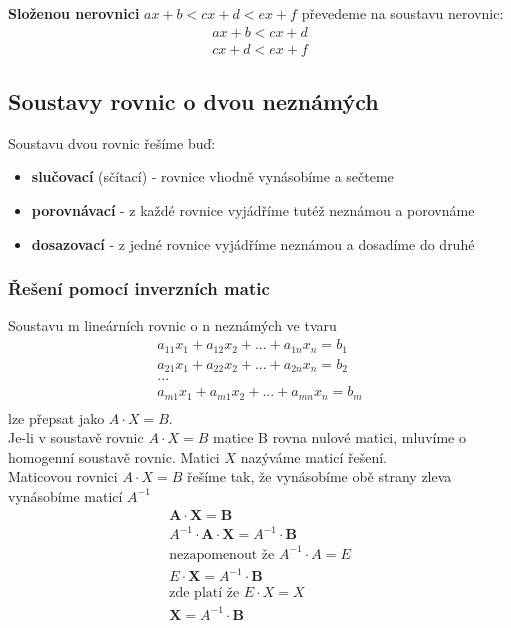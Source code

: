 \documentclass[12pt, a4paper]{article}
\begin{document}
\textbf{Složenou nerovnici} $ax + b < cx + d < ex + f$ převedeme na soustavu nerovnic:
\[ 
\begin{aligned}
ax + b < cx + d\\
cx + d < ex + f
\end{aligned}
\]

\subsection*{Soustavy rovnic o dvou neznámých}

Soustavu dvou rovnic řešíme buď:\\
\begin{itemize}
\item \textbf{slučovací} (sčítací) - rovnice vhodně vynásobíme a sečteme
\item \textbf{porovnávací} - z každé rovnice vyjádříme tutéž neznámou a porovnáme
\item \textbf{dosazovací} - z jedné rovnice vyjádříme neznámou a dosadíme do druhé 
\end{itemize}

\subsubsection*{Řešení pomocí inverzních matic}
Soustavu m lineárních rovnic o n neznámých ve tvaru\\
\[
\begin{aligned}
a_{11}x_1 + a_{12}x_2 + ... + a_{1n}x_n = b_1\\
a_{21}x_1 + a_{22}x_2 + ... + a_{2n}x_n = b_2\\
...\\
a_{m1}x_1 + a_{m1}x_2 + ... + a_{mn}x_n = b_m\\
\end{aligned}
\]
lze přepsat jako $A \cdot X = B$.\\
Je-li v soustavě rovnic $A \cdot X = B$ matice B rovna nulové matici, mluvíme o homogenní soustavě rovnic. Matici $X$ nazýváme maticí řešení.\\
Maticovou rovnici $A \cdot X = B$ řešíme tak, že vynásobíme obě strany zleva vynásobíme maticí $A^{-1}$\\
\[ \begin{aligned}
\textbf{A} \cdot \textbf{X} = \textbf{B}\\
\textbf{$A^{-1}$} \cdot \textbf{A} \cdot \textbf{X} = \textbf{$A^{-1}$} \cdot \textbf{B}\\
\text{nezapomenout že } A^{-1} \cdot A = E\\
E \cdot \textbf{X} = \textbf{$A^{-1}$} \cdot \textbf{B}\\
\text{zde platí že } E \cdot X = X\\
\textbf{X} = \textbf{$A^{-1}$} \cdot \textbf{B}
\end{aligned} \]\\
\end{document}
